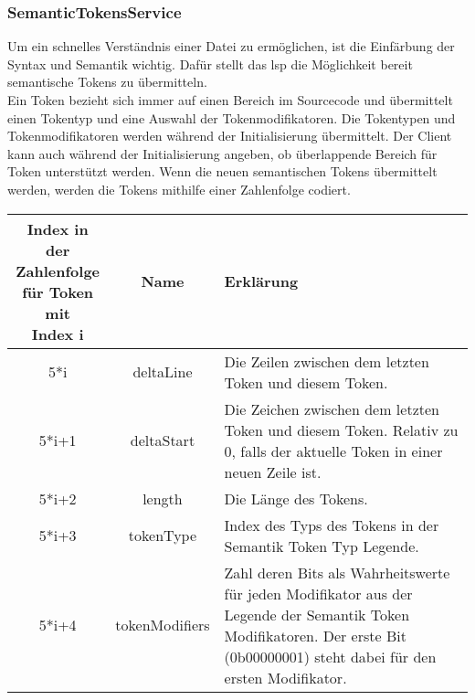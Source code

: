 \documentclass[./einleitung.tex]{subfiles}
\begin{document}
    \subsubsection{SemanticTokensService}\label{subsubsec:semantic-service}
    Um ein schnelles Verständnis einer Datei zu ermöglichen, ist die Einfärbung der Syntax und Semantik wichtig.
    Dafür stellt das \acrshort{lsp} die Möglichkeit bereit semantische Tokens zu übermitteln.\\
    Ein Token bezieht sich immer auf einen Bereich im Sourcecode und übermittelt einen Tokentyp und eine Auswahl der Tokenmodifikatoren.
    Die Tokentypen und Tokenmodifikatoren werden während der Initialisierung übermittelt.
    Der Client kann auch während der Initialisierung angeben, ob überlappende Bereich für Token unterstützt werden.
    Wenn die neuen semantischen Tokens übermittelt werden, werden die Tokens mithilfe einer Zahlenfolge codiert.
    \begin{center}
        \begin{tabular}{| c | c | m{21.5em} |}
            \hline
            \makecell{Index in der\\ Zahlenfolge\\für Token mit \\Index i} & Name & Erklärung \\
            \hline
            5*i & deltaLine & Die Zeilen zwischen dem letzten Token und diesem Token. \\
            \hline
            5*i+1 & deltaStart & Die Zeichen zwischen dem letzten Token und diesem Token.
            Relativ zu 0, falls der aktuelle Token in einer neuen Zeile ist. \\
            \hline
            5*i+2 & length & Die Länge des Tokens. \\
            \hline
            5*i+3 & tokenType & Index des Typs des Tokens in der Semantik Token Typ Legende. \\
            \hline
            5*i+4 & tokenModifiers & Zahl deren Bits als Wahrheitswerte für jeden Modifikator aus der Legende der Semantik Token Modifikatoren.
            Der erste Bit (0b00000001) steht dabei für den ersten Modifikator. \\
            \hline
        \end{tabular}
    \end{center}
\end{document}
